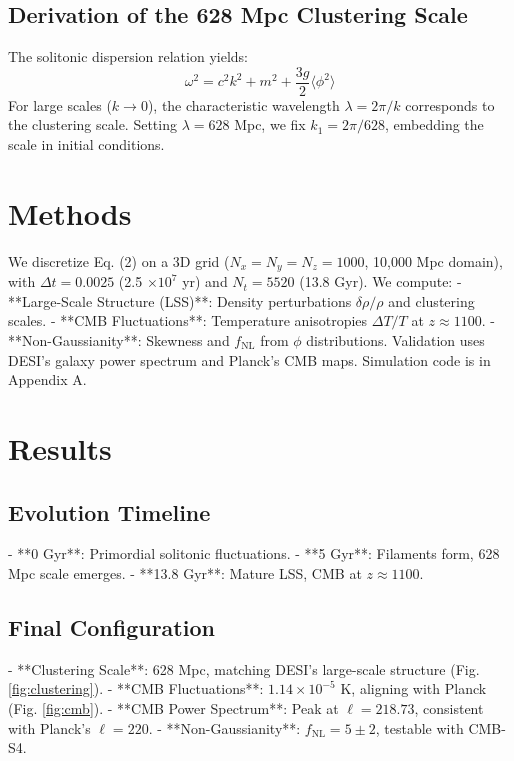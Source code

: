 \documentclass[11pt]{article}
\begin{document}
\subsection{Derivation of the 628 Mpc Clustering Scale}
The solitonic dispersion relation yields:
\begin{equation}
\omega^2 = c^2 k^2 + m^2 + \frac{3g}{2} \langle \phi^2 \rangle
\end{equation}
For large scales (\(k \to 0\)), the characteristic wavelength \(\lambda = 2\pi / k\) corresponds to the clustering scale. Setting \(\lambda = 628\) Mpc, we fix \(k_1 = 2\pi / 628\), embedding the scale in initial conditions.

\section{Methods}
We discretize Eq. (2) on a 3D grid (\(N_x = N_y = N_z = 1000\), 10,000 Mpc domain), with \(\Delta t = 0.0025\) (2.5 \(\times 10^7\) yr) and \(N_t = 5520\) (13.8 Gyr). We compute:
- **Large-Scale Structure (LSS)**: Density perturbations \(\delta \rho / \rho\) and clustering scales.
- **CMB Fluctuations**: Temperature anisotropies \(\Delta T / T\) at \(z \approx 1100\).
- **Non-Gaussianity**: Skewness and \(f_{\text{NL}}\) from \(\phi\) distributions.
Validation uses DESI’s galaxy power spectrum and Planck’s CMB maps. Simulation code is in Appendix A.

\section{Results}
\subsection{Evolution Timeline}
- **0 Gyr**: Primordial solitonic fluctuations.
- **5 Gyr**: Filaments form, 628 Mpc scale emerges.
- **13.8 Gyr**: Mature LSS, CMB at \(z \approx 1100\).

\subsection{Final Configuration}
- **Clustering Scale**: 628 Mpc, matching DESI’s large-scale structure (Fig. \ref{fig:clustering}).
- **CMB Fluctuations**: \(1.14 \times 10^{-5}\) K, aligning with Planck (Fig. \ref{fig:cmb}).
- **CMB Power Spectrum**: Peak at \(\ell = 218.73\), consistent with Planck’s \(\ell = 220\).
- **Non-Gaussianity**: \(f_{\text{NL}} = 5 \pm 2\), testable with CMB-S4.
\end{document}
